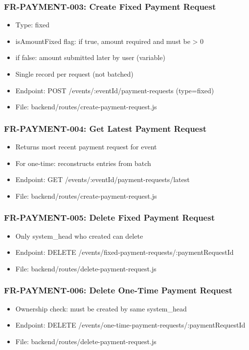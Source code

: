 \documentclass[12pt,a4paper]{article}
\begin{document}
\subsubsection{FR-PAYMENT-003: Create Fixed Payment Request}
\begin{itemize}
  \item Type: fixed
  \item isAmountFixed flag: if true, amount required and must be > 0
  \item if false: amount submitted later by user (variable)
  \item Single record per request (not batched)
  \item Endpoint: POST /events/:eventId/payment-requests (type=fixed)
  \item File: backend/routes/create-payment-request.js
\end{itemize}

\subsubsection{FR-PAYMENT-004: Get Latest Payment Request}
\begin{itemize}
  \item Returns most recent payment request for event
  \item For one-time: reconstructs entries from batch
  \item Endpoint: GET /events/:eventId/payment-requests/latest
  \item File: backend/routes/create-payment-request.js
\end{itemize}

\subsubsection{FR-PAYMENT-005: Delete Fixed Payment Request}
\begin{itemize}
  \item Only system\_head who created can delete
  \item Endpoint: DELETE /events/fixed-payment-requests/:paymentRequestId
  \item File: backend/routes/delete-payment-request.js
\end{itemize}

\subsubsection{FR-PAYMENT-006: Delete One-Time Payment Request}
\begin{itemize}
  \item Ownership check: must be created by same system\_head
  \item Endpoint: DELETE /events/one-time-payment-requests/:paymentRequestId
  \item File: backend/routes/delete-payment-request.js
\end{itemize}
\end{document}
